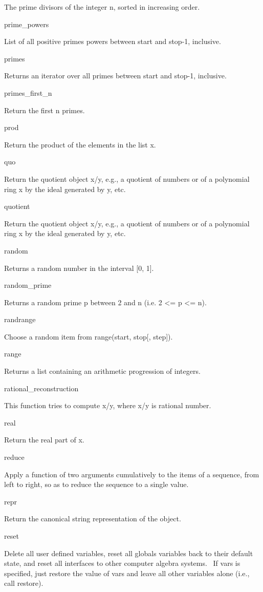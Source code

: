 \documentclass[12pt,twoside]{book}
\begin{document}
The prime divisors of the integer n, sorted in increasing order.

prime\_powers

List of all positive primes powers between start and stop{}-1, inclusive.

primes

Returns an iterator over all primes between start and stop{}-1, inclusive.

primes\_first\_n

Return the first n primes.

prod

Return the product of the elements in the list x.

quo

Return the quotient object x/y, e.g., a quotient of numbers or of a polynomial ring x by the ideal generated by y, etc.

quotient

Return the quotient object x/y, e.g., a quotient of numbers or of a polynomial ring x by the ideal generated by y, etc.

random

Returns a random number in the interval [0, 1].

random\_prime

Returns a random prime p between 2 and n (i.e. 2 {\textless}= p
{\textless}= n).

randrange

Choose a random item from range(start, stop[, step]).

range

Returns a list containing an arithmetic progression of integers.

rational\_reconstruction

This function tries to compute x/y, where x/y is rational number.

real

Return the real part of x.

reduce

Apply a function of two arguments cumulatively to the items of a sequence, from left to right, so as to reduce the sequence to a single value.

repr

Return the canonical string representation of the object.

reset

Delete all user defined variables, reset all globals variables back to their default state, and reset all interfaces to other computer algebra systems. \ If vars is specified, just restore the value of vars and leave all other variables alone (i.e., call restore).
\end{document}
